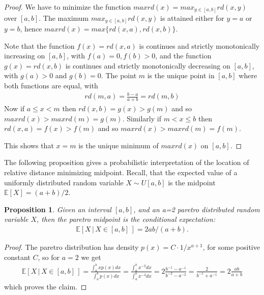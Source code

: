 \documentclass{article}
\theoremstyle{plain}
\newtheorem{proposition}[definition]{Proposition}
\theoremstyle{remark}
\newcommand{\IE}{\mathbb{E}}
\begin{document}
\begin{proof}
  We have to minimize the function $maxrd(x) = max_{y\in[a,b]} rd(x, y)$ over $[a,b]$.
  The maximum $max_{y\in[a,b]} rd(x, y)$ is attained either for $y = a$ or $y = b$,
  hence $maxrd(x) = max\{ rd(x,a), rd(x,b) \}$.

  Note that the function $f(x) = rd(x, a)$ is continues and strictly monotonically increasing on $[a,b]$, with $f(a) = 0, f(b) > 0$,
  and the function $g(x) = rd(x, b)$ is continues and strictly monotonically decreasing on $[a,b]$, with $g(a) > 0$ and $g(b) = 0$.
  The point $m$ is the unique point in $[a,b]$ where both functions are equal, with
  \begin{align*}
    rd(m, a) = \frac{b - a}{a + b} = rd(m, b)
  \end{align*}
  Now if $a \leq x < m$ then $rd(x, b) = g(x) > g(m)$ and so $maxrd(x) > maxrd(m) = g(m)$.
  Similarly if $m < x \leq b$ then $rd(x, a) = f(x) > f(m)$ and so $maxrd(x) > maxrd(m) = f(m)$.

  This shows that $x=m$ is the unique minimum of $maxrd(x)$ on $[a,b]$.
\end{proof}

The following proposition gives a probabilistic interpretation of the location of relative distance minimizing midpoint.
Recall, that the expected value of a uniformly distributed random variable $X \sim U[a,b]$ is the midpoint $\IE[X] = (a+b)/2$.

\begin{proposition}
  Given an interval $[a,b]$, and an a=2 paretro distributed random variable $X$, then
  the paretro midpoint is the conditional expectation:
  \begin{align*}
    \IE[ X \, | \, X \in [a,b] \,] = 2ab / (a + b).
  \end{align*}
\end{proposition}

\begin{proof}
  The paretro distribution has density $p(x) =C \cdot 1/x^{a+1}$, for some positive constant $C$, so for $a=2$ we get
  \begin{align*}
    \IE[ X \, | \, X \in [a,b] \,] = \frac{\int_a^b x p(x) dx}{\int_a^b p(x) dx}
    = \frac{\int_a^b x^{-2}  dx}{\int_a^b x^{-3} dx} = 2 \frac{b^{-1} - a^{-1}}{b^{-2}- a^{-2}}
    = \frac{2}{b^{-1} + a^{-1}}
    = 2 \frac{ab}{a + b}
  \end{align*}
  which proves the claim.
\end{proof}
\end{document}
